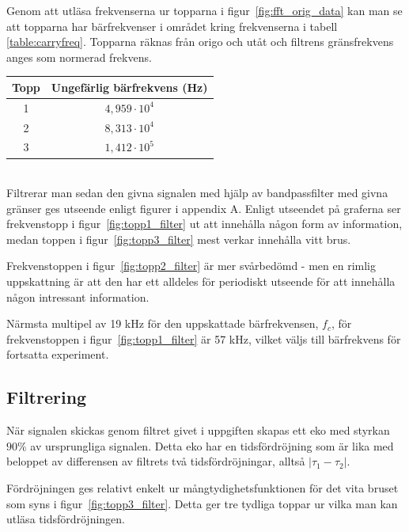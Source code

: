 \documentclass[10pt]{article}
\begin{document}
Genom att utläsa frekvenserna ur topparna i figur~\ref{fig:fft_orig_data} kan man se att topparna har bärfrekvenser i området kring frekvenserna i tabell \ref{table:carryfreq}. Topparna räknas från origo och utåt och filtrens gränsfrekvens anges som normerad frekvens. 
~\\
\begin{center}
\begin{tabular}{c | c }
	\hline
	Topp & Ungefärlig bärfrekvens (Hz) \\ \hline
	1 & $4,959 \cdot 10^4$ \\ \hline
	2 & $8,313 \cdot 10^4$ \\ \hline
	3 & $1,412 \cdot 10^5$ \\ \hline
\end{tabular}
 \label{table:carryfreq}
\end{center}
~\\
Filtrerar man sedan den givna signalen med hjälp av bandpassfilter med givna gränser ges utseende enligt figurer i appendix A. Enligt utseendet på graferna ser frekvenstopp i figur~\ref{fig:topp1_filter} ut att innehålla någon form av information, medan toppen i figur~\ref{fig:topp3_filter} mest verkar innehålla vitt brus. 

Frekvenstoppen i figur~\ref{fig:topp2_filter} är mer svårbedömd - men en rimlig uppskattning är att den har ett alldeles för periodiskt utseende för att innehålla någon intressant information. 

Närmsta multipel av 19 kHz för den uppskattade bärfrekvensen, $f_c$, för frekvenstoppen i figur~\ref{fig:topp1_filter} är 57 kHz, vilket väljs till bärfrekvens för fortsatta experiment. 

\newpage

\subsection{Filtrering}

När signalen skickas genom filtret givet i uppgiften skapas ett eko med styrkan $90\%$ av ursprungliga signalen. Detta eko har en tidsfördröjning som är lika med beloppet av differensen av filtrets två tidsfördröjningar, alltså $|\tau_1 - \tau_2|$.

Fördröjningen ges relativt enkelt ur mångtydighetsfunktionen för det vita bruset som syns i figur~\ref{fig:topp3_filter}. Detta ger tre tydliga toppar ur vilka man kan utläsa tidsfördröjningen. 
\end{document}

